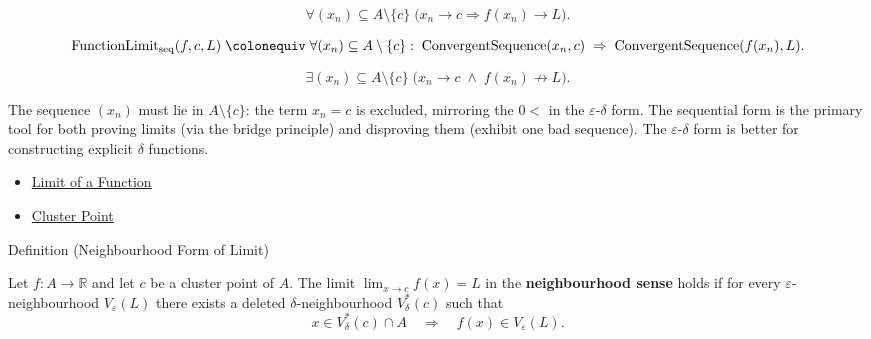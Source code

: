\begin{remark*}
\[
  \forall (x_n) \subseteq A \setminus \{c\}\;
  \bigl(x_n \to c \Rightarrow f(x_n) \to L\bigr).
\]
\end{remark*}

\begin{remark*}
\[
  \operatorname{FunctionLimit}_{\mathrm{seq}}(f, c, L)
  \;\colonequiv\;
  \forall (x_n) \subseteq A \setminus \{c\} :\;
  \operatorname{ConvergentSequence}(x_n, c)
  \;\Rightarrow\;
  \operatorname{ConvergentSequence}(f(x_n), L).
\]
\end{remark*}

\begin{remark*}
\[
  \exists (x_n) \subseteq A \setminus \{c\}\;
  \bigl(x_n \to c \;\wedge\; f(x_n) \not\to L\bigr).
\]
\end{remark*}

\begin{remark*}[Interpretation]
The sequence $(x_n)$ must lie in $A \setminus \{c\}$: the term
$x_n = c$ is excluded, mirroring the $0 <$ in the $\varepsilon$-$\delta$
form. The sequential form is the primary tool for both proving limits
(via the bridge principle) and disproving them (exhibit one bad
sequence). The $\varepsilon$-$\delta$ form is better for constructing
explicit $\delta$ functions.
\end{remark*}

\begin{dependencies}
\begin{itemize}
  \item \hyperref[def:limit-function]{Limit of a Function}
  \item \hyperref[def:cluster-point-r]{Cluster Point}
\end{itemize}
\end{dependencies}


\begin{definitionbox}{Definition (Neighbourhood Form of Limit)}
\begin{definition}
\label{def:limit-function-neighbourhood}
Let $f : A \to \mathbb{R}$ and let $c$ be a cluster point of $A$.
The limit $\lim_{x\to c}f(x)=L$ in the \textbf{neighbourhood
sense} holds if for every $\varepsilon$-neighbourhood
$V_\varepsilon(L)$ there exists a deleted $\delta$-neighbourhood
$V_\delta^*(c)$ such that
\[
  x\in V_\delta^*(c)\cap A
  \quad\Longrightarrow\quad
  f(x)\in V_\varepsilon(L).
\]
\end{definition}
\end{definitionbox}

